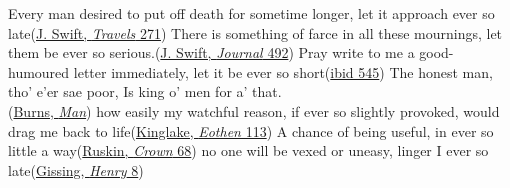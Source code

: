 \ea \label{ex:9-46}
\ea Every man desired to put off death for sometime longer, let it approach ever so late\hfill(\href{https://archive.org/details/bim_eighteenth-century_the-works-of-j-s-dd-_swift-jonathan_1735_3/page/270/mode/2up?view=theater&q=%22desired+to+put%22}{J. Swift, \textit{Travels} 271}) %
\ex There is something of farce in all these mournings, let them be ever so serious.\hfill(\href{https://archive.org/details/journaltostellae00swifuoft/page/492/mode/2up?q=%22something+of+farce%22&view=theater}{J. Swift, \textit{Journal} 492})
\ex Pray write to me a good-humoured letter immediately, let it be ever so short\hfill(\href{https://archive.org/details/journaltostellae00swifuoft/page/544/mode/2up?q=%22good-humoured%22&view=theater}{ibid 545}) %
\ex The honest man, tho' e'er sae poor, Is king o' men for a' that.\\\hfill(\href{https://archive.org/details/selectedpoems00burn/page/226/mode/2up?view=theater}{Burns, \textit{Man}})
\ex how easily my watchful reason, if ever so slightly provoked, would drag me back to life\hfill(\href{https://www.gutenberg.org/files/43684/43684-h/43684-h.htm#page113}{Kinglake, \textit{Eothen} 113})
\ex A chance of being useful, in ever so little a way\hfill(\href{https://archive.org/details/crownofwildolive00ruskiala/page/70/mode/2up?view=theater&q=%22chance+of+being+useful%22}{Ruskin, \textit{Crown} 68}) %
\ex no one will be vexed or uneasy, linger I ever so late\hfill(\href{https://archive.org/details/privatepapersofh0000geor/page/10/mode/2up?q=%22No+one+will+be+vexed%22&view=theater}{Gissing, \textit{Henry} 8})%
\z
\z\largerpage[2]

